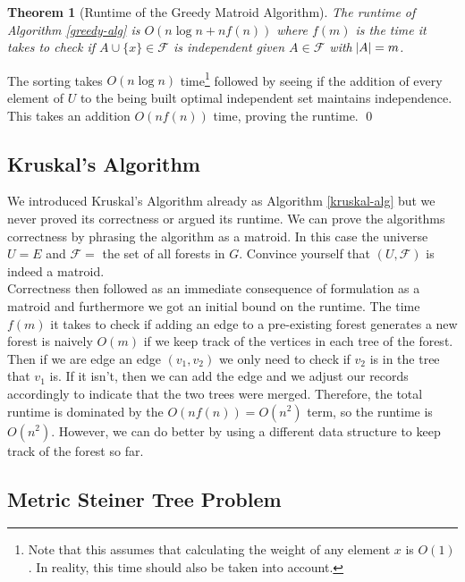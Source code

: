 \documentclass[10pt]{article}
\theoremstyle{plain}
\newtheorem{thm}{Theorem}[section] %
\theoremstyle{definition}
\numberwithin{equation}{section}
\numberwithin{figure}{section}
\begin{document}
\begin{framed}
\begin{thm}[Runtime of the Greedy Matroid Algorithm]
The runtime of Algorithm \ref{greedy-alg} is $O(n \log n + n f(n))$ where $f(m)$ is the time it takes to check if $A \cup \{x\} \in \mathcal{F}$ is independent given $A \in \mathcal{F}$ with $\abs{A} = m$.
\end{thm}
\end{framed}

\proof The sorting takes $O(n \log n)$ time\footnote{Note that this assumes that calculating the weight of any element $x$ is $O(1)$. In reality, this time should also be taken into account.} followed by seeing if the addition of every element of $U$ to the being built optimal independent set maintains independence. This takes an addition $O(n f(n))$ time, proving the runtime. \qed

\subsection{Kruskal's Algorithm}

We introduced Kruskal's Algorithm already as Algorithm \ref{kruskal-alg} but we never proved its correctness or argued its runtime. We can prove the algorithms correctness by phrasing the algorithm as a matroid. In this case the universe $U = E$ and $\mathcal{F} =$ the set of all forests in $G$. Convince yourself that $(U, \mathcal{F})$ is indeed a matroid. \\

\noindent Correctness then followed as an immediate consequence of formulation as a matroid and furthermore we got an initial bound on the runtime. The time $f(m)$ it takes to check if adding an edge to a pre-existing forest generates a new forest is naively $O(m)$ if we keep track of the vertices in each tree of the forest. Then if we are edge an edge $(v_1, v_2)$ we only need to check if $v_2$ is in the tree that $v_1$ is. If it isn't, then we can add the edge and we adjust our records accordingly to indicate that the two trees were merged. Therefore, the total runtime is dominated by the $O(n f(n)) = O(n^2)$ term, so the runtime is $O(n^2)$. However, we can do better by using a different data structure to keep track of the forest so far. \\

\noindent 

\subsection{Metric Steiner Tree Problem}
\end{document}
